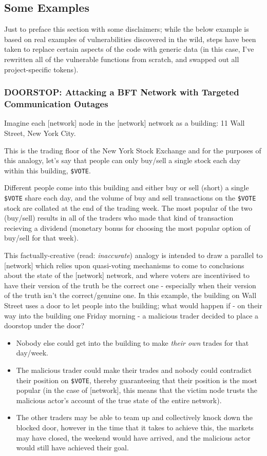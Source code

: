 \subsection{Some Examples}

Just to preface this section with some disclaimers; while the below example is based on real examples of vulnerabilities discovered in the wild,
         	steps have been taken to replace certain aspects of the code with generic data (in this case, I've rewritten all of the vulnerable functions from scratch, and
          	swapped out all project-specific tokens).

\subsubsection{DOORSTOP: Attacking a BFT Network with Targeted Communication Outages}

Imagine each [network] node in the [network] network as a building: 11 Wall Street, New York City.

This is the trading floor of the New York Stock Exchange and for the purposes of this analogy, let's say that people can only buy/sell a single stock each day within this building, \texttt{\$VOTE}.

Different people come into this building and either buy or sell (short) a single \texttt{\$VOTE} share each day, and the volume of buy and sell transactions on the \texttt{\$VOTE} stock are collated at the end of the trading week. The most popular of the two (buy/sell) results in all of the traders who made that kind of transaction recieving a dividend (monetary bonus for choosing the most popular option of buy/sell for that week).

This factually-creative (read: \emph{inaccurate}) analogy is intended to draw a parallel to [network] which relies upon quasi-voting mechanisms to come to conclusions about the state of the [network] network, and where voters are incentivised to have their version of the truth be the correct one - especially when their version of the truth isn't the correct/genuine one.
	        In this example, the building on Wall Street uses a door to let people into the building; what would happen if - on their way into the building one Friday morning - a malicious trader decided to place a doorstop under the door?

\begin{itemize}
\item Nobody else could get into the building to make \emph{their own} trades for that day/week.
\item The malicious trader could make their trades and nobody could contradict their position on \texttt{\$VOTE}, thereby guaranteeing that their position is the most popular (in the case of [network], this means that the victim node trusts the malicious actor's account of the true state of the entire network).
\item The other traders may be able to team up and collectively knock down the blocked door, however in the time that it takes to achieve this, the markets may have closed, the weekend would have arrived, and the malicious actor would still have achieved their goal.
\end{itemize}

